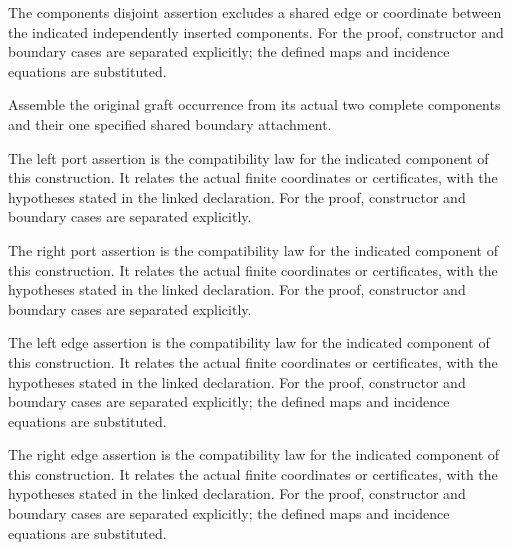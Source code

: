 The components disjoint assertion excludes a shared edge or coordinate between the indicated independently inserted components.
For the proof, constructor and boundary cases are separated explicitly; the defined maps and incidence equations are substituted.
\par{}

Assemble the original graft occurrence from its actual two complete components and their one specified shared boundary attachment.
\par{}

The left port assertion is the compatibility law for the indicated component of this construction. It relates the actual finite coordinates or certificates, with the hypotheses stated in the linked declaration.
For the proof, constructor and boundary cases are separated explicitly.
\par{}

The right port assertion is the compatibility law for the indicated component of this construction. It relates the actual finite coordinates or certificates, with the hypotheses stated in the linked declaration.
For the proof, constructor and boundary cases are separated explicitly.
\par{}

The left edge assertion is the compatibility law for the indicated component of this construction. It relates the actual finite coordinates or certificates, with the hypotheses stated in the linked declaration.
For the proof, constructor and boundary cases are separated explicitly; the defined maps and incidence equations are substituted.
\par{}

The right edge assertion is the compatibility law for the indicated component of this construction. It relates the actual finite coordinates or certificates, with the hypotheses stated in the linked declaration.
For the proof, constructor and boundary cases are separated explicitly; the defined maps and incidence equations are substituted.
\par{}


